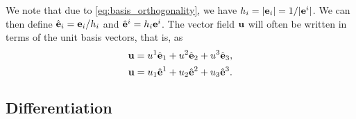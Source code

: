 \documentclass[11pt]{article}
\begin{document}
We note that due to \cref{eq:basis_orthogonality}, we have $h_i = |\mathbf{e}_i| = 1 / | \mathbf{e}^i |$. We can then define $\hat{\mathbf{e}}_i = \mathbf{e}_i / h_i$ and $\hat{\mathbf{e}}^i = h_i \mathbf{e}^i$. The vector field $\mathbf{u}$ will often be written in terms of the unit basis vectors, that is, as
\begin{equation}
    \mathbf{u} = u^1 \hat{\mathbf{e}}_1 + u^2 \hat{\mathbf{e}}_2 + u^3 \hat{\mathbf{e}}_3,
\end{equation}
\begin{equation}
    \mathbf{u} = u_1 \hat{\mathbf{e}}^1 + u_2 \hat{\mathbf{e}}^2 + u_3 \hat{\mathbf{e}}^3.
\end{equation}

\subsection{Differentiation}
\end{document}
